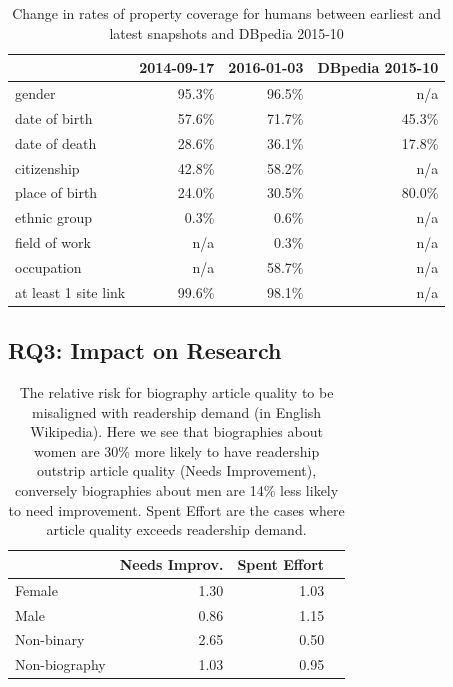 \documentclass{sig-alternate-05-2015}
\begin{document}
\begin{table}
\caption{Change in rates of property coverage for humans between earliest and latest snapshots and DBpedia 2015-10}
\begin{tabular}{lrrr}
\toprule
{} &  2014-09-17 &  2016-01-03 & DBpedia 2015-10\\
\midrule
gender               &       95.3\% &       96.5\% & n/a \\
date of birth        &       57.6\% &       71.7\% & 45.3\% \\
date of death        &       28.6\% &       36.1\% & 17.8\% \\
citizenship          &       42.8\% &       58.2\% & n/a \\
place of birth       &       24.0\% &       30.5\% & 80.0\% \\
ethnic group         &        0.3\% &        0.6\% & n/a \\
field of work        &        n/a &        0.3\% & n/a \\
occupation           &        n/a &       58.7\% & n/a \\
at least 1 site link &       99.6\% &       98.1\% & n/a \\
\bottomrule
\end{tabular}
\label{table:accompanying}
\end{table}

\subsection{RQ3: Impact on Research}

\begin{table}
\caption{The relative risk for biography article quality to be misaligned with readership demand (in English Wikipedia). Here we see that biographies about women are 30\% more likely to have readership outstrip article quality (Needs Improvement), conversely biographies about men are 14\% less likely to need improvement. Spent Effort are the cases where article quality exceeds readership demand.}
\begin{tabular}{lrrr}
\toprule
{} &  Needs Improv. &  Spent Effort \\
\midrule
Female        &               1.30 &          1.03 \\
Male          &               0.86 &          1.15 \\
Non-binary    &               2.65 &          0.50 \\
Non-biography &               1.03 &          0.95 \\
\bottomrule
\end{tabular}
\label{table:pah}
\end{table}
\end{document}
